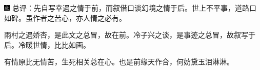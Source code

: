 {\includegraphics[width=3mm]{../Images/00005}  \kaishu  总评：先自写幸遇之情于前，而叙借口谈幻境之情于后。世上不平事，道路口如碑。虽作者之苦心，亦人情之必有。}


{雨村之遇娇杏，是此文之总冒，故在前。冷子兴之谈，是事迹之总冒，故叙写于后。冷暖世情，比比如画。}

{有情原比无情苦，生死相关总在心。也是前缘天作合，何妨黛玉泪淋淋。}

%
%

